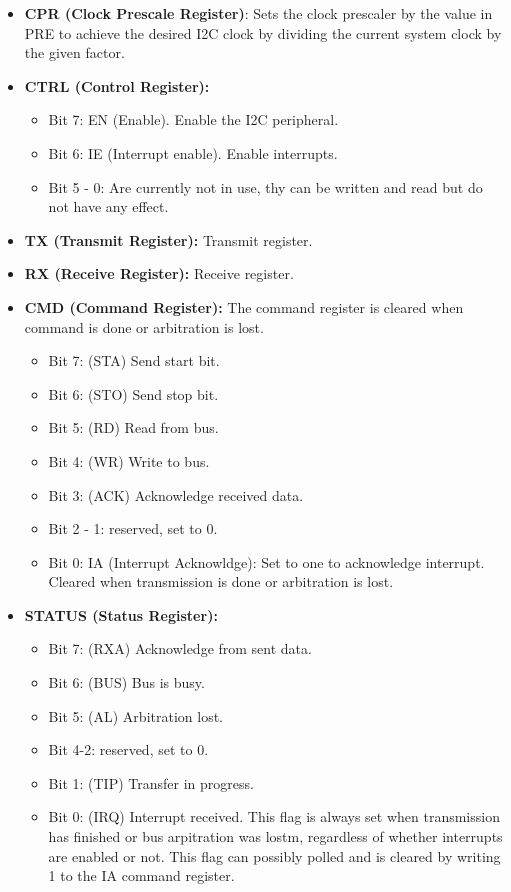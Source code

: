   \begin{itemize}
    \item \textbf{CPR (Clock Prescale Register)}: Sets the clock prescaler by the value in PRE to achieve the desired I2C clock by dividing the current system clock by the given factor.
    \item \textbf{CTRL (Control Register):}  
      \begin{itemize}
        \item Bit 7: EN (Enable). Enable the I2C peripheral.
        \item Bit 6: IE (Interrupt enable). Enable interrupts. 
        \item Bit 5 - 0: Are currently not in use, thy can be written and read but do not have any effect. 
      \end{itemize}
    \item \textbf{TX (Transmit Register):} Transmit register.
    \item \textbf{RX (Receive Register):} Receive register.
    \item \textbf{CMD (Command Register):} The command register is cleared when command is done or arbitration is lost.
    \begin{itemize}
      \item Bit 7: (STA) Send start bit.
      \item Bit 6: (STO) Send stop bit.
      \item Bit 5: (RD) Read from bus.
      \item Bit 4: (WR) Write to bus.
      \item Bit 3: (ACK) Acknowledge received data.
      \item Bit 2 - 1: reserved, set to 0.
      \item Bit 0: IA (Interrupt Acknowldge): Set to one to acknowledge interrupt. Cleared when transmission is done or arbitration is lost.
    \end{itemize}
    \item \textbf{STATUS (Status Register):} 
      \begin{itemize}
        \item Bit 7: (RXA) Acknowledge from sent data.
        \item Bit 6: (BUS) Bus is busy.
        \item Bit 5: (AL) Arbitration lost.
        \item Bit 4-2: reserved, set to 0.
        \item Bit 1: (TIP) Transfer in progress.
        \item Bit 0: (IRQ) Interrupt received. This flag is always set when transmission has finished or bus arpitration was lostm, regardless of whether interrupts are enabled or not. This flag can possibly polled and is cleared by writing 1 to the IA command register.
     \end{itemize}
  \end{itemize}
